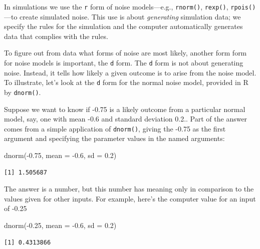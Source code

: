 \documentclass[
  letterpaper,
  DIV=11,
  numbers=noendperiod,
  oneside]{scrartcl}
\newenvironment{Shaded}{\begin{snugshade}}{\end{snugshade}}
\newcommand{\AttributeTok}[1]{\textcolor[rgb]{0.40,0.45,0.13}{#1}}
\newcommand{\FloatTok}[1]{\textcolor[rgb]{0.68,0.00,0.00}{#1}}
\newcommand{\FunctionTok}[1]{\textcolor[rgb]{0.28,0.35,0.67}{#1}}
\newcommand{\NormalTok}[1]{\textcolor[rgb]{0.00,0.23,0.31}{#1}}
\newcommand{\SpecialCharTok}[1]{\textcolor[rgb]{0.37,0.37,0.37}{#1}}
\begin{document}
In simulations we use the \texttt{r} form of noise models---e.g.,
\texttt{rnorm()}, \texttt{rexp()}, \texttt{rpois()}---to create
simulated noise. This use is about \emph{generating} simulation data; we
specify the rules for the simulation and the computer automatically
generates data that complies with the rules.

To figure out from data what forms of noise are most likely, another
form form for noise models is important, the \texttt{d} form. The
\texttt{d} form is not about generating noise. Instead, it tells how
likely a given outcome is to arise from the noise model. To illustrate,
let's look at the \texttt{d} form for the normal noise model, provided
in R by \texttt{dnorm()}.

Suppose we want to know if -0.75 is a likely outcome from a particular
normal model, say, one with mean -0.6 and standard deviation 0.2.. Part
of the answer comes from a simple application of \texttt{dnorm()},
giving the -0.75 as the first argument and specifying the parameter
values in the named arguments:

\begin{Shaded}
\begin{Highlighting}[]
\FunctionTok{dnorm}\NormalTok{(}\SpecialCharTok{{-}}\FloatTok{0.75}\NormalTok{, }\AttributeTok{mean =} \SpecialCharTok{{-}}\FloatTok{0.6}\NormalTok{, }\AttributeTok{sd =} \FloatTok{0.2}\NormalTok{)}
\end{Highlighting}
\end{Shaded}

\begin{verbatim}
[1] 1.505687
\end{verbatim}

The answer is a number, but this number has meaning only in comparison
to the values given for other inputs. For example, here's the computer
value for an input of -0.25

\begin{Shaded}
\begin{Highlighting}[]
\FunctionTok{dnorm}\NormalTok{(}\SpecialCharTok{{-}}\FloatTok{0.25}\NormalTok{, }\AttributeTok{mean =} \SpecialCharTok{{-}}\FloatTok{0.6}\NormalTok{, }\AttributeTok{sd =} \FloatTok{0.2}\NormalTok{)}
\end{Highlighting}
\end{Shaded}

\begin{verbatim}
[1] 0.4313866
\end{verbatim}
\end{document}
